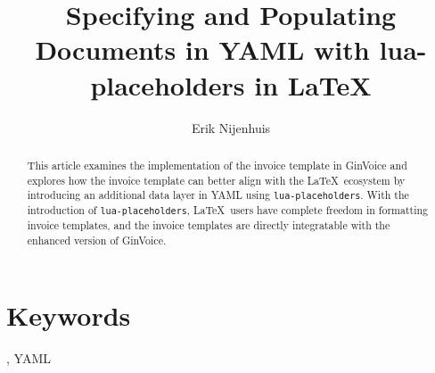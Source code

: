 \documentclass[english]{ltugboat}
\title{Specifying and Populating Documents in YAML with lua-placeholders in LaTeX}
\author{Erik Nijenhuis}
\begin{document}
    \maketitle

    \begin{abstract}
        This article examines the implementation of the invoice template in GinVoice and explores how the invoice template can better align with the \LaTeX\ ecosystem by introducing an additional data layer in YAML using \texttt{lua-placeholders}. With the introduction of \texttt{lua-placeholders}, \LaTeX\ users have complete freedom in formatting invoice templates, and the invoice templates are directly integratable with the enhanced version of GinVoice.
    \end{abstract}

    \section*{Keywords}
    \LuaLaTeX, YAML

    

    

    

    

    

    

    

    \makesignature
\end{document}
